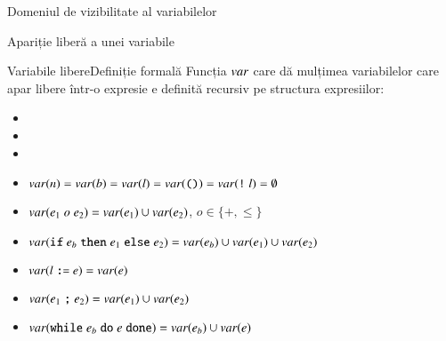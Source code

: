 \documentclass[xcolor=pdftex,romanian,colorlinks]{beamer}
\begin{document}
\begin{section}{Domeniul de vizibilitate al variabilelor}
\begin{frame}{Apariție liberă a unei variabile}
\end{frame}

\begin{frame}{Variabile libere}{Definiție formală}
Funcția $\mathop{var}$ care dă mulțimea variabilelor care apar libere într-o expresie e definită recursiv pe structura expresiilor:
\begin{itemize}
\item {}
\item {}
\item {}
\item $\mathop{var}(n) = \mathop{var}(b) = \mathop{var}(l) = \mathop{var}(\mathrel{\text{\ttfamily ()}}) = \mathop{var}(\mathrel{\text{\ttfamily !}} l)  =\emptyset$
\item $\mathop{var}(e_1 \mathrel{o} e_2) = \mathop{var}(e_1) \cup \mathop{var}(e_2)$, $o\in \{+,\leq\}$
\item $\mathop{var}(\mathrel{\text{\ttfamily if}} e_b \mathrel{\text{\ttfamily then}} e_1 \mathrel{\text{\ttfamily else}} e_2) = \mathop{var}(e_b) \cup\mathop{var}(e_1) \cup\mathop{var}(e_2)$
\item $\mathop{var}(l \mathrel{\text{\ttfamily :=}} e) = \mathop{var}(e)$
\item $\mathop{var}(e_1 \mathrel{\text{\ttfamily ;}} e_2) = \mathop{var}(e_1) \cup \mathop{var}(e_2)$
\item $\mathop{var}(\mathrel{\text{\ttfamily while}} e_b \mathrel{\text{\ttfamily do}} e \mathrel{\text{\ttfamily done}}) = \mathop{var}(e_b) \cup \mathop{var}(e)$
\end{itemize}
\end{frame}

\end{section}
\end{document}

